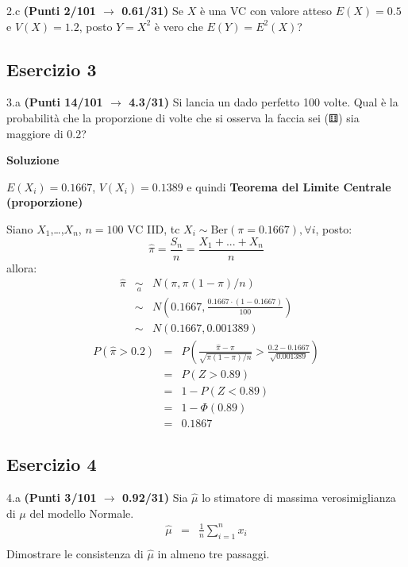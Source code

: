 \documentclass[
  11pt,
]{book}
\theoremstyle{mytheoremstyle}
\theoremstyle{mydefstyle}
\begin{document}
2.c \textbf{(Punti 2/101 \(\rightarrow\) 0.61/31)} Se \(X\) è una VC con valore atteso \(E(X)=0.5\) e \(V(X)=1.2\), posto \(Y=X^2\) è vero che \(E(Y)=E^2(X)\)?

\subsection{Esercizio 3}\label{esercizio-3-10}

3.a \textbf{(Punti 14/101 \(\rightarrow\) 4.3/31)} Si lancia un dado perfetto 100 volte. Qual è la probabilità che la proporzione di volte che si osserva la faccia sei (⚅) sia maggiore di 0.2?

\textbf{Soluzione}

\(E(X_i)=0.1667\), \(V(X_i)=0.1389\) e quindi
\textbf{Teorema del Limite Centrale (proporzione)}

Siano \(X_1\),\ldots,\(X_n\), \(n=100\) VC IID, tc \(X_i\sim\text{Ber}(\pi=0.1667)\)\(,\forall i\), posto:
\[
      \hat\pi=\frac{S_n}n = \frac{X_1 + ... + X_n}n
      \]
allora:\begin{eqnarray*}
  \hat\pi & \mathop{\sim}\limits_{a}& N(\pi,\pi(1-\pi)/n) \\
  &\sim & N\left(0.1667,\frac{0.1667\cdot(1-0.1667)}{100}\right) \\
     &\sim & N(0.1667,0.001389) 
  \end{eqnarray*}\begin{eqnarray*}
      P( \hat\pi   >   0.2 ) 
        &=& P\left(  \frac { \hat\pi  -  \pi }{ \sqrt{\pi(1-\pi)/n} }  >  \frac { 0.2  -  0.1667 }{\sqrt{ 0.001389 }} \right)  \\
                 &=& P\left(  Z   >   0.89 \right) \\    &=& 1-P(Z< 0.89 )\\ 
                 &=&  1-\Phi( 0.89 ) \\ &=&  0.1867 
      \end{eqnarray*}

\subsection{Esercizio 4}\label{esercizio-4-10}

4.a \textbf{(Punti 3/101 \(\rightarrow\) 0.92/31)} Sia \(\hat \mu\) lo stimatore di massima verosimiglianza di \(\mu\) del modello Normale.
\begin{eqnarray*}
  \hat\mu &=&  \frac 1n\sum_{i=1}^nx_i\\
\end{eqnarray*}
Dimostrare le consistenza di \(\hat\mu\) in almeno tre passaggi.
\end{document}
